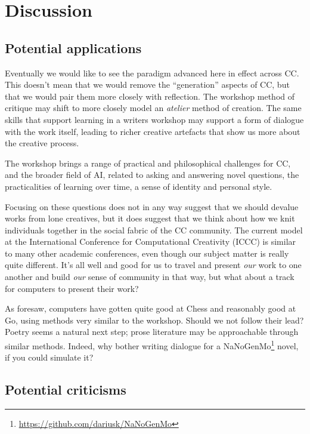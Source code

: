 \section{Discussion} \label{sec:discussion}

\subsection{Potential applications}

Eventually we would like to see the paradigm advanced here in effect
across CC.  This doesn't mean that we would remove the ``generation''
aspects of CC, but that we would pair them more closely with
reflection.  The workshop method of critique may shift to more closely
model an \emph{atelier} method of creation.  The same skills that
support learning in a writers workshop may support a form of dialogue
with the work itself, leading to richer creative artefacts that show
us more about the creative process.

The workshop brings a range of practical and philosophical challenges
for CC, and the broader field of AI, related to asking and answering
novel questions, the practicalities of learning over time, a sense of
identity and personal style.

Focusing on these questions does not in any way suggest that we should
devalue works from lone creatives, but it does suggest that we think
about how we knit individuals together in the social fabric of the CC
community.  The current model at the International Conference for
Computational Creativity (ICCC) is similar to many other academic
conferences, even though our subject matter is really quite different.
It's all well and good for us to travel and present \emph{our} work to
one another and build \emph{our} sense of community in that way, but
what about a track for computers to present their work?

As \cite{turing-intelligent} foresaw, computers have gotten quite good
at Chess and reasonably good at Go, using methods very similar to the
workshop.  Should we not follow their lead?  Poetry seems a natural
next step; prose literature may be approachable through similar
methods.  Indeed, why bother writing dialogue for a
NaNoGenMo\footnote{\url{https://github.com/dariusk/NaNoGenMo}} novel,
if you could simulate it?

\subsection{Potential criticisms}

